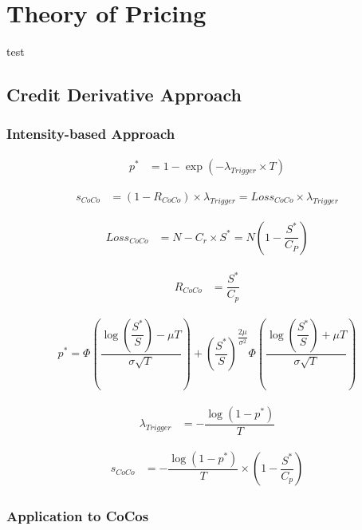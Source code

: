 \chapter{Theory of Pricing}
test
\section{Credit Derivative Approach}

\subsection{Intensity-based Approach}

\begin{align}
    p^* &= 1 - \exp\left(- \lambda_{Trigger} \times T\right)
\end{align}

\begin{align}
    s_{CoCo} &= \left(1 - R_{CoCo}\right) \times \lambda_{Trigger} = {Loss}_{CoCo} \times \lambda_{Trigger}
\end{align}

\begin{align}
    {Loss}_{CoCo} &= N - C_r \times S^* = N \left(1 - \dfrac{S^*}{C_P} \right)
\end{align}

\begin{align}
    R_{CoCo} &= \dfrac{S^*}{C_p}
\end{align}

\begin{align}
    p^* = \Phi\left( \dfrac{\log \left(\dfrac{S^*}{S}\right) - \mu T}{\sigma \sqrt{T}}\right) + \left(\dfrac{S^*}{S}\right)^{\dfrac{2 \mu}{\sigma^2}} \Phi\left( \dfrac{\log \left(\dfrac{S^*}{S}\right) + \mu T}{\sigma \sqrt{T}}\right)
\end{align}

\begin{align}
\lambda_{Trigger} &= - \dfrac{\log \left(1 - p^* \right)}{T}
\end{align}

\begin{align}
s_{CoCo} &= -\dfrac{\log \left(1 - p^*\right)}{T} \times \left( 1 - \dfrac{S^*}{C_p} \right)
\end{align}

\subsection{Application to CoCos}

